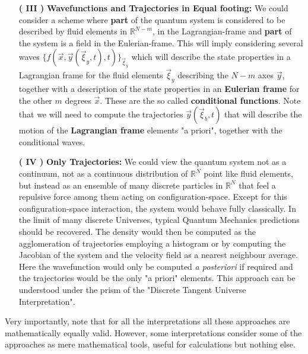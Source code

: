 \documentclass[11pt, a4paper]{article} %
\newcommand{\R}{\mathbb{R}} %
\begin{document}
\begin{enumerate}
\item[{\bf ( III )}]{\bf Wavefunctions and Trajectories in Equal footing: } We could consider a scheme where {\bf part} of the quantum system is considered to be described by fluid elements in $\R^{N-m}$, in the Lagrangian-frame and {\bf part} of the system is a field in the Eulerian-frame. This will imply considering several waves $\{ f(\vec{x}, \vec{y}(\vec{\xi}_y,t), t) \}_{\vec{\xi}_y}$ which will describe the state properties in a Lagrangian frame for the fluid elements $\vec{\xi}_y$ describing the $N-m$ axes $\vec{y}$, together with a description of the state properties in an {\bf Eulerian frame} for the other $m$ degrees $\vec{x}$. These are the so called {\bf conditional functions}. Note that we will need to compute the trajectories $\vec{y}(\vec{\xi}_b,t)$ that will describe the motion of the {\bf Lagrangian frame} elements "a priori", together with the conditional waves. 


\item[\bf ( IV ) ]{\bf Only Trajectories: } We could view the quantum system not as a continuum, not as a continuous distribution of $\R^N$ point like fluid elements, but instead as an ensemble of many discrete particles in $\R^N$ that feel a repulsive force among them acting on configuration-space. Except for this configuration-space interaction, the system would behave fully classically. In the limit of many discrete Universes, typical Quantum Mechanics predictions should be recovered. The density would then be computed as the agglomeration of trajectories employing a histogram or by computing the Jacobian of the system and the velocity field as a nearest neighbour average. Here the wavefunction would only be computed {\em a posteriori} if required and the trajectories would be the only "a priori" elements. This approach can be understood under the prism of the "Discrete Tangent Universe Interpretation".\vspace{-0.2cm}
\end{enumerate}
Very importantly, note that for all the interpretations all these approaches are mathematically equally valid. However, some interpretations consider some of the approaches as mere mathematical tools, useful for calculations but nothing else.
\end{document}

